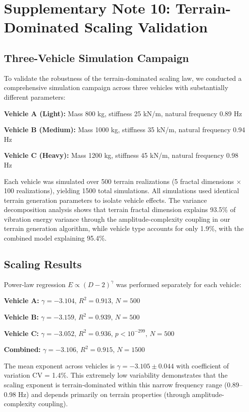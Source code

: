 \documentclass[11pt]{article}
\begin{document}
\section{Supplementary Note 10: Terrain-Dominated Scaling Validation}

\subsection{Three-Vehicle Simulation Campaign}

To validate the robustness of the terrain-dominated scaling law, we conducted a comprehensive simulation campaign across three vehicles with substantially different parameters:

\textbf{Vehicle A (Light):} Mass 800 kg, stiffness 25 kN/m, natural frequency 0.89 Hz

\textbf{Vehicle B (Medium):} Mass 1000 kg, stiffness 35 kN/m, natural frequency 0.94 Hz

\textbf{Vehicle C (Heavy):} Mass 1200 kg, stiffness 45 kN/m, natural frequency 0.98 Hz

Each vehicle was simulated over 500 terrain realizations (5 fractal dimensions $\times$ 100 realizations), yielding 1500 total simulations. All simulations used identical terrain generation parameters to isolate vehicle effects. The variance decomposition analysis shows that terrain fractal dimension explains 93.5\% of vibration energy variance through the amplitude-complexity coupling in our terrain generation algorithm, while vehicle type accounts for only 1.9\%, with the combined model explaining 95.4\%.

\subsection{Scaling Results}

Power-law regression $E \propto (D-2)^\gamma$ was performed separately for each vehicle:

\textbf{Vehicle A:} $\gamma = -3.104$, $R^2 = 0.913$, $N = 500$

\textbf{Vehicle B:} $\gamma = -3.159$, $R^2 = 0.939$, $N = 500$

\textbf{Vehicle C:} $\gamma = -3.052$, $R^2 = 0.936$, $p < 10^{-299}$, $N = 500$

\textbf{Combined:} $\gamma = -3.106$, $R^2 = 0.915$, $N = 1500$

The mean exponent across vehicles is $\gamma = -3.105 \pm 0.044$ with coefficient of variation CV = 1.4\%. This extremely low variability demonstrates that the scaling exponent is terrain-dominated within this narrow frequency range (0.89--0.98 Hz) and depends primarily on terrain properties (through amplitude-complexity coupling).
\end{document}
